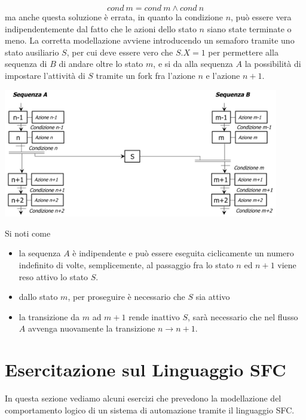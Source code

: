 \documentclass[10pt, letterpaper]{report}
\begin{document}
 $$cond\ m = cond \ m \land cond \ n $$
 ma anche questa soluzione è errata, in quanto la condizione $n$, può essere vera indipendentemente dal fatto che le azioni dello stato $n$ siano state terminate o meno.\acc 
 La corretta modellazione avviene introducendo un semaforo tramite uno stato ausiliario $S$, per cui deve essere vero che $S.X=1$ per permettere alla sequenza di $B$ di andare oltre lo stato $m$, e si da alla sequenza $A$ la possibilità di impostare l'attività di $S$ tramite un fork fra l'azione $n$ e l'azione $n+1$.
 \begin{center}
    \includegraphics[width=0.9\textwidth ]{images/relazione3.png}
\end{center}
Si noti come \begin{itemize}
    \item la sequenza $A$ è indipendente e può essere eseguita ciclicamente un numero indefinito di volte, semplicemente, al passaggio fra lo stato $n$ ed $n+1$ viene reso attivo lo stato $S$. 
    \item dallo stato $m$, per proseguire è necessario che $S$ sia attivo 
    \item la transizione da $m$ ad $m+1$ rende inattivo $S$, sarà necessario che nel flusso $A$ avvenga nuovamente la transizione $n\longrightarrow n+1$.
\end{itemize}
\flowerLine 
\section{Esercitazione sul Linguaggio SFC}
In questa sezione vediamo alcuni esercizi che prevedono la modellazione del comportamento logico di un sistema di automazione tramite il linguaggio SFC.
\end{document}

